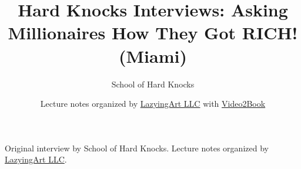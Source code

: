 \documentclass[11pt,oneside]{book}
\begin{document}
\frontmatter
\title{Hard Knocks Interviews: Asking Millionaires How They Got RICH! (Miami)}
\author{School of Hard Knocks}
\date{Lecture notes organized by \href{https://lazying.art}{LazyingArt LLC} with \href{https://github.com/lachlanchen/Video2Book}{Video2Book}}
\maketitle
\begin{center}
\small Original interview by School of Hard Knocks. Lecture notes organized by \href{https://lazying.art}{LazyingArt LLC}.
\end{center}
\clearpage
\mainmatter

\end{document}

